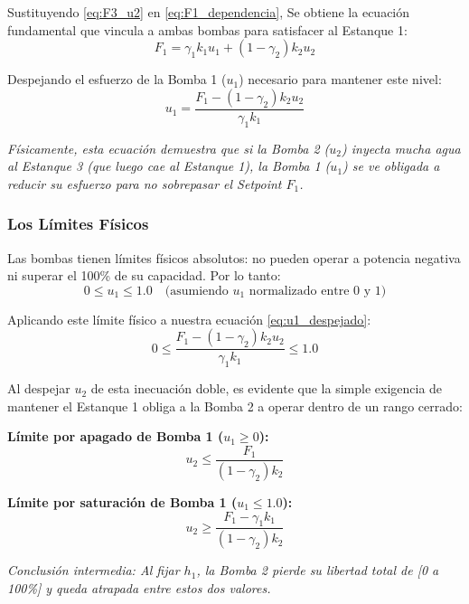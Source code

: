 Sustituyendo \eqref{eq:F3_u2} en \eqref{eq:F1_dependencia}, Se obtiene la ecuación fundamental que vincula a ambas bombas para satisfacer al Estanque 1:
\begin{equation}
F_1 = \gamma_1 k_1 u_1 + (1-\gamma_2) k_2 u_2
\label{eq:vinculo_bombas}
\end{equation}

Despejando el esfuerzo de la Bomba 1 ($u_1$) necesario para mantener este nivel:
\begin{equation}
u_1 = \frac{F_1 - (1-\gamma_2) k_2 u_2}{\gamma_1 k_1}
\label{eq:u1_despejado}
\end{equation}

\textit{Físicamente, esta ecuación demuestra que si la Bomba 2 ($u_2$) inyecta mucha agua al Estanque 3 (que luego cae al Estanque 1), la Bomba 1 ($u_1$) se ve obligada a reducir su esfuerzo para no sobrepasar el Setpoint $F_1$.}

\subsubsection{Los Límites Físicos}
Las bombas tienen límites físicos absolutos: no pueden operar a potencia negativa ni superar el 100\% de su capacidad. Por lo tanto:
\begin{equation*}
0 \le u_1 \le 1.0 \quad \text{(asumiendo $u_1$ normalizado entre 0 y 1)}
\end{equation*}

Aplicando este límite físico a nuestra ecuación \eqref{eq:u1_despejado}:
\begin{equation}
0 \le \frac{F_1 - (1-\gamma_2) k_2 u_2}{\gamma_1 k_1} \le 1.0
\end{equation}

Al despejar $u_2$ de esta inecuación doble, es evidente que la simple exigencia de mantener el Estanque 1 obliga a la Bomba 2 a operar dentro de un rango cerrado:

\textbf{Límite por apagado de Bomba 1 ($u_1 \ge 0$):}
\begin{equation}
u_2 \le \frac{F_1}{(1-\gamma_2)k_2}
\label{eq:u2_maximo}
\end{equation}

\textbf{Límite por saturación de Bomba 1 ($u_1 \le 1.0$):}
\begin{equation}
u_2 \ge \frac{F_1 - \gamma_1 k_1}{(1-\gamma_2)k_2}
\label{eq:u2_minimo}
\end{equation}

\textit{Conclusión intermedia: Al fijar $h_1$, la Bomba 2 pierde su libertad total de [0 a 100\%] y queda atrapada entre estos dos valores.}

